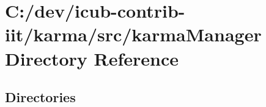\section{C\+:/dev/icub-\/contrib-\/iit/karma/src/karma\+Manager Directory Reference}
\label{dir_d5fc9e74ecd446ba07279cb903928e76}
\subsection*{Directories}
\begin{DoxyCompactItemize}
\end{DoxyCompactItemize}

